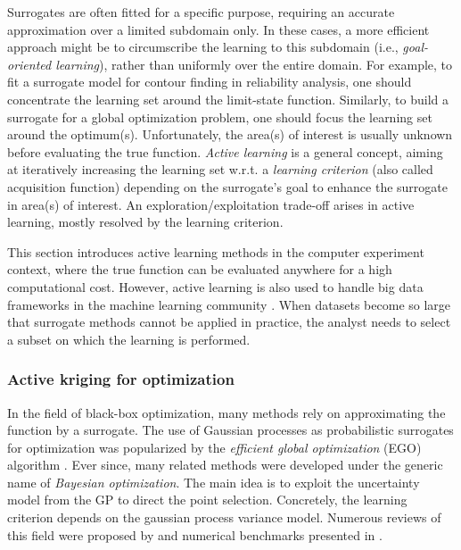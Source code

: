Surrogates are often fitted for a specific purpose, requiring an accurate approximation over a limited subdomain only.
In these cases, a more efficient approach might be to circumscribe the learning to this subdomain (i.e., \textit{goal-oriented learning}), rather than uniformly over the entire domain. 
For example, to fit a surrogate model for contour finding in reliability analysis, one should concentrate the learning set around the limit-state function. 
Similarly, to build a surrogate for a global optimization problem, one should focus the learning set around the optimum(s).
Unfortunately, the area(s) of interest is usually unknown before evaluating the true function. 
\textit{Active learning} is a general concept, aiming at iteratively increasing the learning set w.r.t. a \textit{learning criterion} (also called acquisition function) depending on the surrogate's goal to enhance the surrogate in area(s) of interest. 
An exploration/exploitation trade-off arises in active learning, mostly resolved by the learning criterion.

\begin{remark}
    This section introduces active learning methods in the computer experiment context, where the true function can be evaluated anywhere for a high computational cost. 
    However, active learning is also used to handle big data frameworks in the machine learning community \citep{qiu_2016}. 
    When datasets become so large that surrogate methods cannot be applied in practice, the analyst needs to select a subset on which the learning is performed.  
\end{remark}

\subsubsection{Active kriging for optimization}

In the field of black-box optimization, many methods rely on approximating the function by a surrogate. 
The use of Gaussian processes as probabilistic surrogates for optimization was popularized by the \textit{efficient global optimization} (EGO) algorithm \citep{jones_1998}. 
Ever since, many related methods were developed under the generic name of \textit{Bayesian optimization}. 
The main idea is to exploit the uncertainty model from the GP to direct the point selection. 
Concretely, the learning criterion depends on the gaussian process variance model.  
Numerous reviews of this field were proposed by \citet{shahriari_2015,gramacy_2020_book} and numerical benchmarks presented in \citet{leriche_2021}.

